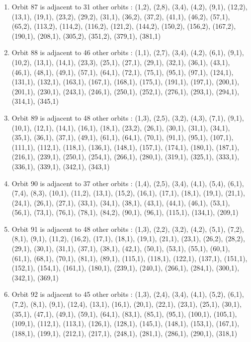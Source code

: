 \documentclass[12pt]{article}
\begin{document}
\begin{enumerate}
\item Orbit 87 is adjacent to 31 other orbits : (1,2), (2,8), (3,4), (4,2), (9,1), (12,2), (13,1), (19,1), (23,2), (29,2), (31,1), (36,2), (37,2), (41,1), (46,2), (57,1), (65,2), (113,2), (114,2), (116,2), (121,2), (144,2), (150,2), (156,2), (167,2), (190,1), (208,1), (305,2), (351,2), (379,1), (381,1)
\item Orbit 88 is adjacent to 46 other orbits : (1,1), (2,7), (3,4), (4,2), (6,1), (9,1), (10,2), (13,1), (14,1), (23,3), (25,1), (27,1), (29,1), (32,1), (36,1), (43,1), (46,1), (48,1), (49,1), (57,1), (64,1), (72,1), (75,1), (95,1), (97,1), (124,1), (131,1), (132,1), (163,1), (167,1), (168,1), (175,1), (191,1), (197,1), (200,1), (201,1), (230,1), (243,1), (246,1), (250,1), (252,1), (276,1), (293,1), (294,1), (314,1), (345,1)
\item Orbit 89 is adjacent to 48 other orbits : (1,3), (2,5), (3,2), (4,3), (7,1), (9,1), (10,1), (12,1), (14,1), (16,1), (18,1), (23,2), (26,1), (30,1), (31,1), (34,1), (35,1), (36,1), (37,1), (49,1), (61,1), (64,1), (70,1), (91,1), (95,1), (107,1), (111,1), (112,1), (118,1), (136,1), (148,1), (157,1), (174,1), (180,1), (187,1), (216,1), (239,1), (250,1), (254,1), (266,1), (280,1), (319,1), (325,1), (333,1), (336,1), (339,1), (342,1), (343,1)
\item Orbit 90 is adjacent to 37 other orbits : (1,4), (2,5), (3,4), (4,1), (5,4), (6,1), (7,4), (8,3), (10,1), (11,2), (13,1), (15,2), (16,1), (17,1), (18,1), (19,1), (21,1), (24,1), (26,1), (27,1), (33,1), (34,1), (38,1), (43,1), (44,1), (46,1), (53,1), (56,1), (73,1), (76,1), (78,1), (84,2), (90,1), (96,1), (115,1), (134,1), (209,1)
\item Orbit 91 is adjacent to 48 other orbits : (1,3), (2,2), (3,2), (4,2), (5,1), (7,2), (8,1), (9,1), (11,2), (16,2), (17,1), (18,1), (19,1), (21,1), (23,1), (26,2), (28,2), (29,1), (30,1), (31,1), (37,1), (38,1), (42,1), (50,1), (53,1), (55,1), (60,1), (61,1), (68,1), (70,1), (81,1), (89,1), (115,1), (118,1), (122,1), (137,1), (151,1), (152,1), (154,1), (161,1), (180,1), (239,1), (240,1), (266,1), (284,1), (300,1), (342,1), (369,1)
\item Orbit 92 is adjacent to 45 other orbits : (1,3), (2,4), (3,4), (4,1), (5,2), (6,1), (7,2), (8,1), (9,1), (12,4), (13,1), (16,1), (20,1), (22,1), (23,1), (25,1), (30,1), (35,1), (47,1), (49,1), (59,1), (64,1), (83,1), (85,1), (95,1), (100,1), (105,1), (109,1), (112,1), (113,1), (126,1), (128,1), (145,1), (148,1), (153,1), (167,1), (188,1), (199,1), (212,1), (217,1), (248,1), (281,1), (286,1), (290,1), (318,1)

\end{enumerate}
\end{document}
